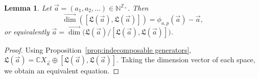 \documentclass[11pt]{amsart}
\newtheorem{lemma}[theorem]{Lemma}
\theoremstyle{definition}
\numberwithin{equation}{section}
\def\NN{{\mathbb N}}
\def\CC{{\mathbb C}}
\def\ZZ{{\mathbb Z}}
\newcommand{\vecdim}{\overrightarrow{\dim}}
\newcommand{\mike}[1]{\todo[size=\tiny,color=green!30]{#1 \\ \hfill --- Mike}}
\begin{document}
\begin{lemma}
\label{lem:deriveddimension}
Let $\vec{a} = (a_{1}, a_{2}, \ldots) \in \NN^{\ZZ_{+}}$.  Then
\[
\vecdim([\mathfrak{L}(\vec{a}), \mathfrak{L}(\vec{a})]) = \phi_{a, p}(\vec{a}) - \vec{a},
\]
or equivalently $\vec{a} = \vecdim\big(\mathfrak{L}(\vec{a})\big/ [\mathfrak{L}(\vec{a}), \mathfrak{L}(\vec{a})]\big)$.
\end{lemma}
\begin{proof}
Using Proposition~\ref{prop:indecomposable generators}, $ \mathfrak{L}(\vec{a}) = \CC X_{\vec{a}} \oplus [\mathfrak{L}(\vec{a}), \mathfrak{L}(\vec{a})]$.  Taking the dimension vector of each space, we obtain an equivalent equation.
%
\end{proof}
\end{document}

